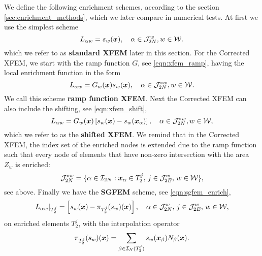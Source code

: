We define the following enrichment schemes, according to the section \ref{sec:enrichment_methods},
which we later compare in numerical tests. At first we use the simplest scheme
\begin{equation} \label{eqn:prim_standard_xfem}
    L_{\alpha w} = s_{w}(\mathbf{\boldsymbol{x}}), \quad \alpha\in\mathcal{J}^w_{2N}, w\in\mathcal{W}.
\end{equation}
which we refer to as \textbf{standard XFEM} later in this section.
%
For the Corrected XFEM, we start with the ramp function $G$, see \eqref{eqn:xfem_ramp},
having the local enrichment function in the form
\begin{equation} \label{eqn:prim_xfem_ramp}
    L_{\alpha w} = G_w(\mathbf{\boldsymbol{x}}) s_{w}(\mathbf{\boldsymbol{x}}), \quad \alpha\in\mathcal{J}^{*w}_{2N}, w\in\mathcal{W}.
\end{equation}
We call this scheme \textbf{ramp function XFEM}.
Next the Corrected XFEM can also include the shifting, see \eqref{eqn:xfem_shift},
\begin{equation} \label{eqn:prim_xfem_shift}
    L_{\alpha w} = G_w(\mathbf{\boldsymbol{x}}) \left[s_w(\mathbf{\boldsymbol{x}}) - s_w(\mathbf{\boldsymbol{x}}_\alpha)\right],
    \quad \alpha\in\mathcal{J}^{*w}_{2N}, w\in\mathcal{W},
\end{equation} 
which we refer to as the \textbf{shifted XFEM}.
We remind that in the Corrected XFEM, the index set of the enriched nodes is extended due to the ramp function
such that every node of elements that have non-zero intersection with the area $Z_w$ is enriched:
\begin{equation} \label{eqn:prim_enriched_nodes_corr}
    \mathcal{J}^{*w}_{2N} = \{\alpha\in\mathcal{I}_{2N}: \mathbf{\boldsymbol{x}}_\alpha\in T^j_2,\, j\in\mathcal{J}^w_{2E},\, w\in\mathcal{W}\},
\end{equation}
see  above. Finally we have the \textbf{SGFEM} scheme, see \eqref{eqn:sgfem_enrich},
\begin{equation} \label{eqn:prim_sgfem_enrich}
    L_{\alpha w}|_{T_2^j} = \left[s_w(\mathbf{\boldsymbol{x}}) - \pi_{T_2^j} (s_w)(\mathbf{\boldsymbol{x}})\right],
    \quad \alpha\in\mathcal{J}^w_{2N},\, j\in\mathcal{J}^w_{2E},\, w\in\mathcal{W},
\end{equation}
on enriched elements $T_2^j$,
with the interpolation operator
\begin{equation} \label{eqn:prim_sgfem_interpolation}
    \pi_{T_2^j} (s_w)(\mathbf{\boldsymbol{x}}) = \sum_{\beta\in\mathcal{I}_N(T_2^j)} s_w(\mathbf{\boldsymbol{x}}_\beta) N_\beta(\mathbf{\boldsymbol{x}}).
\end{equation}



